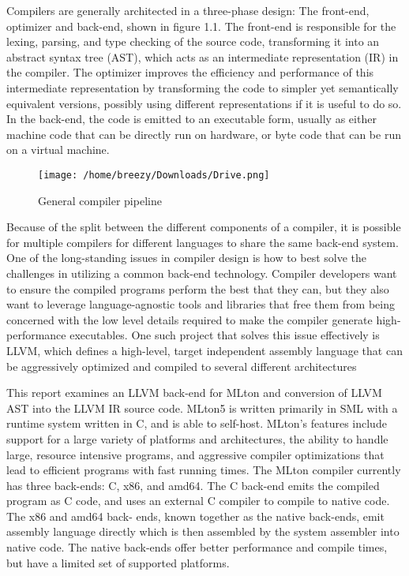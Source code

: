 \documentclass{book}
\begin{document}
Compilers are generally architected in a three-phase design: The front-end, optimizer
and back-end, shown in figure 1.1. The front-end is responsible for the lexing, parsing, and
type checking of the source code, transforming it into an abstract syntax tree (AST), which
acts as an intermediate representation (IR) in the compiler. The optimizer improves the
efficiency and performance of this intermediate representation by transforming the code to
simpler yet semantically equivalent versions, possibly using different representations if it
is useful to do so. In the back-end, the code is emitted to an executable form, usually as
either machine code that can be directly run on hardware, or byte code that can be run on a
virtual machine.\linebreak \linebreak 
\begin{figure}
	\texttt{[image: /home/breezy/Downloads/Drive.png]}
	\caption{General compiler pipeline}
	\label{fig:1.1}
\end{figure} Because of the split between the different components of a compiler, it is possible for
multiple compilers for different languages to share the same back-end system. One of the
long-standing issues in compiler design is how to best solve the challenges in utilizing a
common back-end technology. Compiler developers want to ensure the compiled programs
perform the best that they can, but they also want to leverage language-agnostic tools and
libraries that free them from being concerned with the low level details required to make the compiler generate high-performance executables.  One such project that solves this issue
effectively is LLVM, which defines a high-level, target independent assembly language
that can be aggressively optimized and compiled to several different architectures 

 This  report  examines  an  LLVM  back-end  for  MLton and conversion of LLVM AST into the LLVM IR source code. MLton5
is written primarily in SML with a runtime system written in C, and is able to self-host.
MLton's  features  include  support  for  a  large  variety  of  platforms  and  architectures,  the
ability to handle large, resource intensive programs, and aggressive compiler optimizations
that lead to efficient programs with fast running times. The MLton compiler currently has
three back-ends:  C, x86, and amd64.  The C back-end emits the compiled program as C
code, and uses an external C compiler to compile to native code. The x86 and amd64 back-
ends, known together as the native back-ends, emit assembly language directly which is
then assembled by the system assembler into native code. The native back-ends offer better
performance and compile times, but have a limited set of supported platforms.
\end{document}
